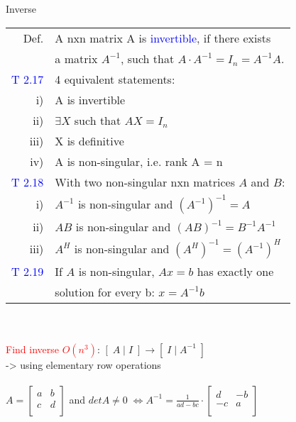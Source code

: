 \begin{mainbox}{Inverse}
\setlength{\tabcolsep}{2pt}
\begin{tabular}{rl}
	Def. & A nxn matrix A is \textcolor{blue}{invertible}, if there exists\\
	& a matrix $A^{-1}$, such that $A\cdot A^{-1} = I_n = A^{-1}A$.\\
	\rule{0pt}{3ex}
	\textcolor{blue}{T 2.17} & 4 equivalent statements:\\
	i) & A is invertible\\
	ii) & $\exists X$ such that $AX = I_n$\\
	iii) & X is definitive\\
	iv) & A is non-singular, i.e. rank A = n\\
	\rule{0pt}{3ex}
	\textcolor{blue}{T 2.18} & With two non-singular nxn matrices $A$ and $B$:\\
	i) & $A^{-1}$ is non-singular and $(A^{-1})^{-1} = A$\\
	ii) & $AB$ is non-singular and $(AB)^{-1} = B^{-1}A^{-1}$\\
	iii) & $A^H$ is non-singular and $(A^H)^{-1} = (A^{-1})^H$\\
	\rule{0pt}{3ex}
	\textcolor{blue}{T 2.19} & If $A$ is non-singular, $Ax = b$ has exactly one\\
	& solution for every b: $x = A^{-1}b$\\
\end{tabular}\\
\smallskip\\
\textcolor{red}{Find inverse $O(n^3)$}: $[\;A\;|\;I\;]\longrightarrow[\;I\;|\;A^{-1}\;]$\\
-> using elementary row operations\\
\smallskip\\
$A = \begin{bmatrix}
a & b \\
c & d \\
\end{bmatrix}$ and $detA \neq 0\;\Leftrightarrow A^{-1}=\frac{1}{ad-bc}\cdot \begin{bmatrix}
d & -b \\
-c & a \\
\end{bmatrix}$
\end{mainbox}

